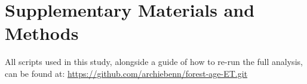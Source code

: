\newpage

\appendix
\setcounter{equation}{0}
\setcounter{table}{0}
\renewcommand{\thesection}{S\arabic{section}}
\renewcommand{\thesubsection}{S\arabic{section}.\arabic{subsection}}
\renewcommand{\theequation}{S\arabic{equation}}
\renewcommand{\thefigure}{S\arabic{figure}}
\renewcommand{\thetable}{S\arabic{table}}



\section{Supplementary Materials and Methods}
All scripts used in this study, alongside a guide of how to re-run the full analysis, can be found at: \url{https://github.com/archiebenn/forest-age-ET.git}


